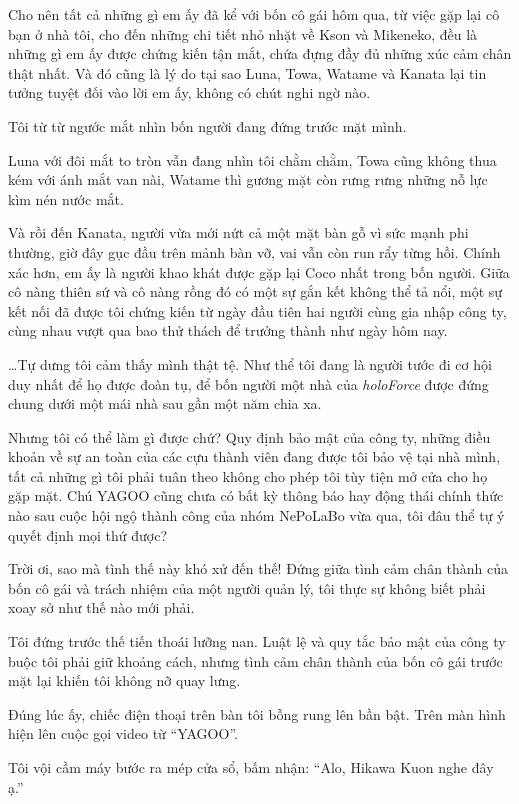 \documentclass[../main.tex]{subfiles}
\begin{document}
Cho nên tất cả những gì em ấy đã kể với bốn cô gái hôm qua, từ việc gặp lại cô bạn ở nhà tôi, cho đến những chi tiết nhỏ nhặt về Kson và Mikeneko, đều là những gì em ấy được chứng kiến tận mắt, chứa đựng đầy đủ những xúc cảm chân thật nhất. Và đó cũng là lý do tại sao Luna, Towa, Watame và Kanata lại tin tưởng tuyệt đối vào lời em ấy, không có chút nghi ngờ nào.

Tôi từ từ ngước mắt nhìn bốn người đang đứng trước mặt mình.

Luna với đôi mắt to tròn vẫn đang nhìn tôi chằm chằm, Towa cũng không thua kém với ánh mắt van nài, Watame thì gương mặt còn rưng rưng những nỗ lực kìm nén nước mắt.

Và rồi đến Kanata, người vừa mới nứt cả một mặt bàn gỗ vì sức mạnh phi thường, giờ đây gục đầu trên mảnh bàn vỡ, vai vẫn còn run rẩy từng hồi. Chính xác hơn, em ấy là người khao khát được gặp lại Coco nhất trong bốn người. Giữa cô nàng thiên sứ và cô nàng rồng đó có một sự gắn kết không thể tả nổi, một sự kết nối đã được tôi chứng kiến từ ngày đầu tiên hai người cùng gia nhập công ty, cùng nhau vượt qua bao thử thách để trưởng thành như ngày hôm nay.

\dots Tự dưng tôi cảm thấy mình thật tệ. Như thể tôi đang là người tước đi cơ hội duy nhất để họ được đoàn tụ, để bốn người một nhà của \textit{holoForce} được đứng chung dưới một mái nhà sau gần một năm chia xa.

Nhưng tôi có thể làm gì được chứ? Quy định bảo mật của công ty, những điều khoản về sự an toàn của các cựu thành viên đang được tôi bảo vệ tại nhà mình, tất cả những gì tôi phải tuân theo không cho phép tôi tùy tiện mở cửa cho họ gặp mặt. Chú YAGOO cũng chưa có bất kỳ thông báo hay động thái chính thức nào sau cuộc hội ngộ thành công của nhóm NePoLaBo vừa qua, tôi đâu thể tự ý quyết định mọi thứ được?

Trời ơi, sao mà tình thế này khó xử đến thế! Đứng giữa tình cảm chân thành của bốn cô gái và trách nhiệm của một người quản lý, tôi thực sự không biết phải xoay sở như thế nào mới phải.

Tôi đứng trước thế tiến thoái lưỡng nan. Luật lệ và quy tắc bảo mật của công ty buộc tôi phải giữ khoảng cách, nhưng tình cảm chân thành của bốn cô gái trước mặt lại khiến tôi không nỡ quay lưng.

Đúng lúc ấy, chiếc điện thoại trên bàn tôi bỗng rung lên bần bật. Trên màn hình hiện lên cuộc gọi video từ ``YAGOO''.

Tôi vội cầm máy bước ra mép cửa sổ, bấm nhận: ``Alo, Hikawa Kuon nghe đây ạ.''
\end{document}
